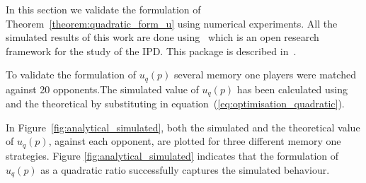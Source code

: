 \documentclass[10pt]{article}
\begin{document}
In this section we validate the formulation of Theorem~\ref{theorem:quadratic_form_u}
using numerical experiments. All the simulated results of this work are done
using~\cite{axelrodproject} which is an open research framework for the study of
the IPD. This package is described in~\cite{Knight2016}.

To validate the formulation of \(u_q(p)\) several memory one players were 
matched against 20 opponents.The simulated value of \(u_q(p)\) has been calculated
using \cite{axelrodproject} and the theoretical by  substituting in equation~(\ref{eq:optimisation_quadratic}).

In Figure~\ref{fig:analytical_simulated}, both the simulated and the theoretical
value of \(u_q(p)\), against each opponent, are plotted for three different memory
one strategies. Figure \ref{fig:analytical_simulated} indicates that the 
formulation of \(u_q(p)\) as a quadratic ratio successfully captures the 
simulated behaviour.
\end{document}
